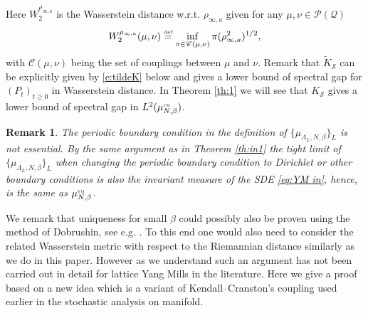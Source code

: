 \documentclass[11pt,UTF-8,reqno]{amsart}
\numberwithin{equation}{section}
\newtheorem{remark}[theorem]{Remark}
\newcommand{\eqdef}{\stackrel{\mbox{\tiny def}}{=}}
\def\cQ{{\mathcal Q}}
\def\cS{{\mathcal S}}
\def\sC{{\mathscr C}}
\def\sP{{\mathscr P}}
\def\geq{\geqslant}
\def\br{\begin{remark}}
\def\er{\end{remark}}
\def\geq{\geqslant}
\def\YM{\textnormal{\tiny \textsc{ym}}}
\def\muYM{\mu^{\YM}_{N,\beta}}
\begin{document}
Here $W_2^{\rho_{\infty,a}}$ is the Wasserstein distance  w.r.t. $\rho_{\infty,a}$ given for any $\mu, \nu\in \sP(\cQ)$
\begin{align*}
	W_2^{\rho_{\infty,a}}(\mu,\nu)\eqdef \inf_{\pi\in \sC(\mu,\nu)}\pi(\rho_{\infty,a}^2)^{1/2},
\end{align*}
with $\sC(\mu,\nu)$ being the set of couplings between $\mu$ and $\nu$. Remark that $\widetilde{K}_\cS$ can be explicitly given by \eqref{e:tildeK} below and gives a lower bound of spectral gap for $(P_t)_{t\geq0}$ in Wasserstein distance. In Theorem \ref{th:1} we will see that $K_\cS$  gives a lower bound of spectral gap in $L^2(\muYM)$. 


\br\label{rem:bc}
The periodic boundary condition in the definition of $\{\mu_{\Lambda_L,N,\beta}\}_L$ is not essential.  By the same argument as in Theorem \ref{th:in1} the tight limit of $\{\mu_{\Lambda_L,N,\beta}\}_L$ when  changing the periodic boundary condition to Dirichlet  or other boundary conditions is also the invariant measure of the SDE \eqref{eq:YM in}, hence, is the same as $\muYM$.
\er


We remark that uniqueness for small $\beta$ could possibly also be proven using the method of Dobrushin, see e.g. \cite{Dobrushin1970}. To this end one would also need to consider the related Wasserstein metric with respect to the  Riemannian distance similarly as we do in this paper. However as we understand such an argument has not been carried out in detail for lattice Yang Mills in the literature. Here  we give a  proof based on a new idea which is a variant of  Kendall--Cranston's coupling used earlier in the stochastic analysis on manifold.

% 
%


\end{document}
